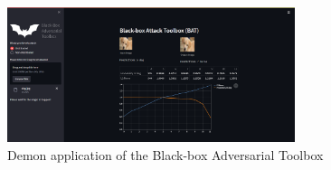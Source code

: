 \begin{figure}[H]
\centering
\includegraphics[width=0.75\textwidth]{figures/chapter_classification/bat_app.png}
\caption{Demon application of the Black-box Adversarial Toolbox}
\label{fig.bat_app}
\end{figure}


